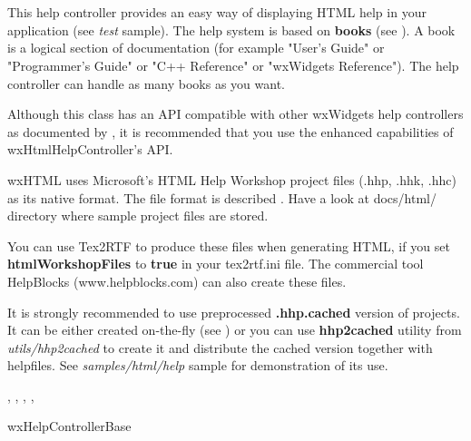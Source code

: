 %
%

\section{}\label{wxhtmlhelpcontroller}

This help controller provides an easy way of displaying HTML help in your
application (see {\it test} sample). The help system is based on {\bf books} 
(see ). A book is a logical
section of documentation (for example "User's Guide" or "Programmer's Guide" or
"C++ Reference" or "wxWidgets Reference"). The help controller can handle as
many books as you want.

Although this class has an API compatible with other wxWidgets
help controllers as documented by , it
is recommended that you use the enhanced capabilities of wxHtmlHelpController's API.

wxHTML uses Microsoft's HTML Help Workshop project files (.hhp, .hhk, .hhc) as its
native format. The file format is described .
Have a look at docs/html/ directory where sample project files are stored.

You can use Tex2RTF to produce these files when generating HTML, if you set {\bf htmlWorkshopFiles} to {\bf true} in
your tex2rtf.ini file. The commercial tool HelpBlocks (www.helpblocks.com) can also create these files.


It is strongly recommended to use preprocessed {\bf .hhp.cached} version of
projects. It can be either created on-the-fly (see 
) or you can use 
{\bf hhp2cached} utility from {\it utils/hhp2cached} to create it and
distribute the cached version together with helpfiles. See {\it samples/html/help} 
sample for demonstration of its use.


, 
, 
, 
,


wxHelpControllerBase

